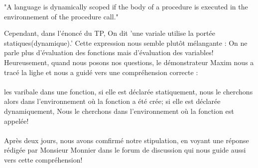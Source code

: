 \documentclass{article}
\begin{document}
   "A language is dynamically scoped if the body of a procedure is executed in the environnement of the procedure call."

 Cependant, dans l'énoncé du TP, On dit 
'une variale utilise la portée statiques(dynamique).' Cette expression nous
semble plutôt mélangante : On ne parle plus d'évaluation des fonctions mais d'évaluation des variables!
Heureusement, quand nous posons nos questions, le démonstrateur Maxim nous a tracé la lighe
et nous a guidé vers une compréhension correcte : \\
\\
les varibale dans une fonction, si elle est déclarée 
statiquement, nous le cherchons alors dans l'environnement où la fonction a été crée; si elle
est déclarée dynamiquement, Nous le cherchons dans l'environnement où la fonction
est appelée!\\
\\
Après deux jours, nous avons comfirmé notre stipulation, en voyant une réponse rédigée par 
Monsieur Monnier dans le forum de discussion qui nous guide aussi vers cette compréhension! 
\end{document}
